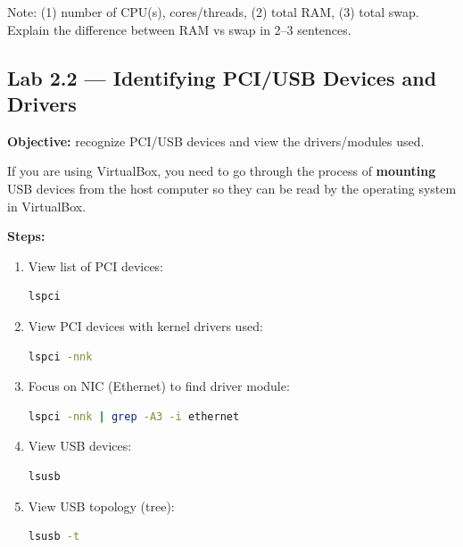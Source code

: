 \begin{exercisebox}[2.1]
Note: (1) number of CPU(s), cores/threads, (2) total RAM, (3) total swap. Explain the difference between RAM vs swap in 2--3 sentences.
\end{exercisebox}

\subsection*{Lab 2.2 --- Identifying PCI/USB Devices and Drivers}
\textbf{Objective:} recognize PCI/USB devices and view the drivers/modules used.

\begin{notebox}
If you are using VirtualBox, you need to go through the process of \textbf{mounting} USB devices from the host computer so they can be read by the operating system in VirtualBox.
\end{notebox}

\textbf{Steps:}
\begin{enumerate}
    \item View list of PCI devices:
\begin{lstlisting}[language=bash, caption={List of PCI devices (brief)}]
lspci
\end{lstlisting}

    \item View PCI devices with kernel drivers used:
\begin{lstlisting}[language=bash, caption={View PCI device drivers}]
lspci -nnk
\end{lstlisting}

    \item Focus on NIC (Ethernet) to find driver module:
\begin{lstlisting}[language=bash, caption={Find NIC info and its driver}]
lspci -nnk | grep -A3 -i ethernet
\end{lstlisting}

    \item View USB devices:
\begin{lstlisting}[language=bash, caption={List of USB devices}]
lsusb
\end{lstlisting}

    \item View USB topology (tree):
\begin{lstlisting}[language=bash, caption={USB device topology}]
lsusb -t
\end{lstlisting}
\end{enumerate}

